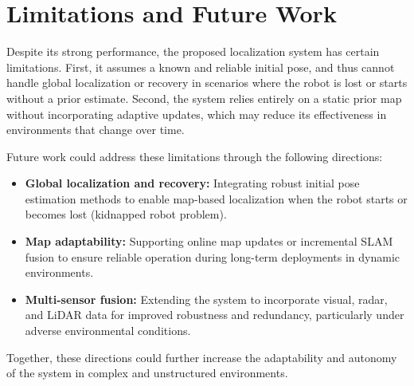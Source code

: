 \section{Limitations and Future Work}

Despite its strong performance, the proposed localization system has certain limitations. First, it assumes a known and reliable initial pose, and thus cannot handle global localization or recovery in scenarios where the robot is lost or starts without a prior estimate. Second, the system relies entirely on a static prior map without incorporating adaptive updates, which may reduce its effectiveness in environments that change over time.

Future work could address these limitations through the following directions:

\begin{itemize}
	\item \textbf{Global localization and recovery:} Integrating robust initial pose estimation methods to enable map-based localization when the robot starts or becomes lost (kidnapped robot problem).
	\item \textbf{Map adaptability:} Supporting online map updates or incremental SLAM fusion to ensure reliable operation during long-term deployments in dynamic environments.
	\item \textbf{Multi-sensor fusion:} Extending the system to incorporate visual, radar, and LiDAR data for improved robustness and redundancy, particularly under adverse environmental conditions.
\end{itemize}

Together, these directions could further increase the adaptability and autonomy of the system in complex and unstructured environments.
